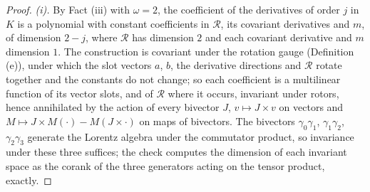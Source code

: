 \begin{proof}
\emph{(i).} By Fact (iii) with $\omega = 2$, the coefficient of the derivatives of order $j$ in $K$ is a polynomial with constant coefficients in $\mathcal{R}$, its covariant derivatives and $m$, of dimension $2 - j$, where $\mathcal{R}$ has dimension $2$ and each covariant derivative and $m$ dimension $1$. The construction is covariant under the rotation gauge (Definition (e)), under which the slot vectors $a$, $b$, the derivative directions and $\mathcal{R}$ rotate together and the constants do not change; so each coefficient is a multilinear function of its vector slots, and of $\mathcal{R}$ where it occurs, invariant under rotors, hence annihilated by the action of every bivector $J$, $v \mapsto J\times v$ on vectors and $M \mapsto J\times M(\cdot) - M(J\times\cdot)$ on maps of bivectors. The bivectors $\gamma_{0}\gamma_{1}$, $\gamma_{1}\gamma_{2}$, $\gamma_{2}\gamma_{3}$ generate the Lorentz algebra under the commutator product, so invariance under these three suffices; the check computes the dimension of each invariant space as the corank of the three generators acting on the tensor product, exactly.


\end{proof}
